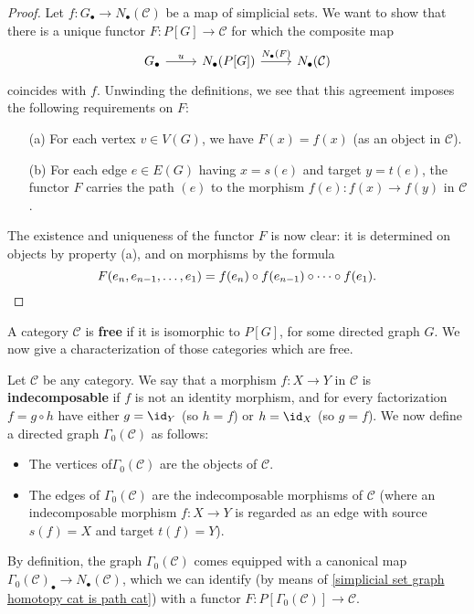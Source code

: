 \begin{proof}
Let $f:G_\bullet\to N_\bullet(\mathcal{C})$ be a map of simplicial sets. We want to show that there is a unique functor $F:P[G]\to\mathcal{C}$ for which the composite map
\[\begin{tikzcd}
G_\bullet\ar[r,"u"]&N_\bullet(P[G])\ar[r,"N_\bullet(F)"]&N_\bullet(\mathcal{C})
\end{tikzcd}
\]
coincides with $f$. Unwinding the definitions, we see that this agreement imposes the following requirements on $F$:
\begin{itemize}
\item[(a)] For each vertex $v\in V(G)$, we have $F(x)=f(x)$ (as an object in $\mathcal{C}$).
\item[(b)] For each edge $e\in E(G)$ having $x=s(e)$ and target $y=t(e)$, the functor $F$ carries the path $(e)$ to the morphism $f(e):f(x)\to f(y)$ in $\mathcal{C}$.
\end{itemize}
The existence and uniqueness of the functor $F$ is now clear: it is determined on objects by property (a), and on morphisms by the formula
\begin{equation*}
F(e_n,e_{n-1},\dots,e_1)=f(e_n)\circ f(e_{n-1})\circ\cdots\circ f(e_1).\qedhere
\end{equation*}
\end{proof}
A category $\mathcal{C}$ is \textbf{free} if it is isomorphic to $P[G]$, for some directed graph $G$. We now give a characterization of those categories which are free.\par
Let $\mathcal{C}$ be any category. We say that a morphism $f:X\to Y$ in $\mathcal{C}$ is \textbf{indecomposable} if $f$ is not an identity morphism, and for every factorization $f=g\circ h$ have either $g=\id_Y$ (so $h=f$) or $h=\id_X$ (so $g=f$). We now define a directed graph $\Gamma_0(\mathcal{C})$ as follows:
\begin{itemize}
\item The vertices of$\Gamma_0(\mathcal{C})$ are the objects of $\mathcal{C}$.
\item The edges of $\Gamma_0(\mathcal{C})$ are the indecomposable morphisms of $\mathcal{C}$ (where an indecomposable morphism $f:X\to Y$ is regarded as an edge with source $s(f)=X$ and target $t(f)=Y$).
\end{itemize}
By definition, the graph $\Gamma_0(\mathcal{C})$ comes equipped with a canonical map $\Gamma_0(\mathcal{C})_\bullet\to N_\bullet(\mathcal{C})$, which we can identify (by means of \cref{simplicial set graph homotopy cat is path cat}) with a functor $F:P[\Gamma_0(\mathcal{C})]\to\mathcal{C}$.
